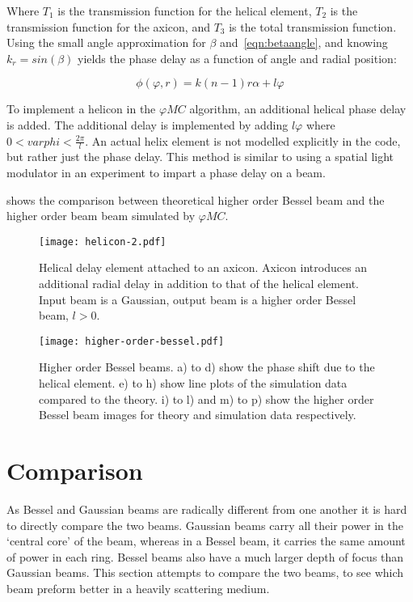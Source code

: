 Where $T_1$ is the transmission function for the helical element, $T_2$ is the transmission function for the axicon, and $T_3$ is the total transmission function.
Using the small angle approximation  for $\beta$ and~\cref{eqn:betaangle}, and knowing $k_r=sin\left(\beta\right)$ yields the phase delay as a function of angle and radial position:

\begin{equation}
\phi(\varphi,r)=k(n-1)r\alpha+l\varphi
\end{equation}

To implement a helicon in the $\varphi MC$ algorithm, an additional helical phase delay is added.
The additional delay is implemented by adding $l\varphi$ where $0<varphi<\tfrac{2\pi}{l}$.
An actual helix element is not modelled explicitly in the code, but rather just the phase delay.
This method is similar to using a spatial light modulator in an experiment to impart a phase delay on a beam.

 shows the comparison between theoretical higher order Bessel beam and the higher order beam beam simulated by $\varphi MC$.

\begin{figure}[!ht]
    \centering
    \texttt{[image: helicon-2.pdf]}
    \caption{Helical delay element attached to an axicon. Axicon introduces an additional radial delay in addition to that of the helical element. Input beam is a Gaussian, output beam is a higher order Bessel beam, $l>0$.}
    \label{fig:helix-2}
    \vspace{-10pt}
\end{figure}

\begin{figure}[!ht]
    \centering
    \texttt{[image: higher-order-bessel.pdf]}
    \caption{Higher order Bessel beams. a) to d) show the phase shift due to the helical element. e) to h) show line plots of the simulation data compared to the theory. i) to l) and m) to p) show the higher order Bessel beam images for theory and simulation data respectively.}
    \label{fig:highordershow}
\end{figure}

\FloatBarrier
\section{Comparison}

As Bessel and Gaussian beams are radically different from one another it is hard to directly compare the two beams.
Gaussian beams carry all their power in the `central core' of the beam, whereas in a Bessel beam, it carries the same amount of power in each ring.
Bessel beams also have a much larger depth of focus than Gaussian beams.
This section attempts to compare the two beams, to see which beam preform better in a heavily scattering medium.

